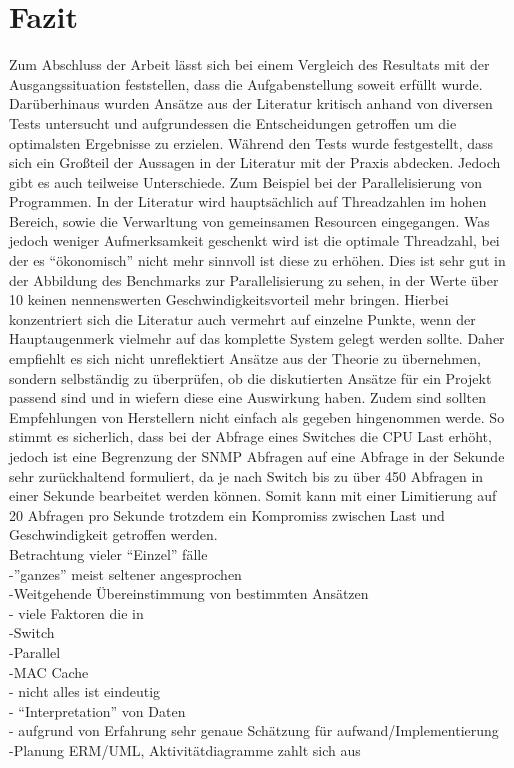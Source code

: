 \chapter{Fazit}
\label{cha:Fazit}

Zum Abschluss der Arbeit lässt sich bei einem Vergleich des Resultats mit der Ausgangssituation feststellen, dass die Aufgabenstellung soweit erfüllt wurde. Darüberhinaus wurden Ansätze aus der Literatur kritisch anhand von diversen Tests untersucht und aufgrundessen die Entscheidungen getroffen um die optimalsten Ergebnisse zu erzielen.
Während den Tests wurde festgestellt, dass sich ein Großteil der Aussagen in der Literatur mit der Praxis abdecken. Jedoch gibt es auch teilweise Unterschiede. Zum Beispiel bei der Parallelisierung von Programmen. In der Literatur wird hauptsächlich auf Threadzahlen im hohen Bereich, sowie die Verwarltung von gemeinsamen Resourcen eingegangen. Was jedoch weniger Aufmerksamkeit geschenkt wird ist die optimale Threadzahl, bei der es “ökonomisch” nicht mehr sinnvoll ist diese zu erhöhen. Dies ist sehr gut in der Abbildung des Benchmarks zur Parallelisierung zu sehen, in der Werte über 10 keinen nennenswerten Geschwindigkeitsvorteil mehr bringen. Hierbei konzentriert sich die Literatur auch vermehrt auf einzelne Punkte, wenn der Hauptaugenmerk vielmehr auf das komplette System gelegt werden sollte. Daher empfiehlt es sich nicht unreflektiert Ansätze aus der Theorie zu übernehmen, sondern selbständig zu überprüfen, ob die diskutierten Ansätze für ein Projekt passend sind und in wiefern diese eine Auswirkung haben.
Zudem sind sollten Empfehlungen von Herstellern nicht einfach als gegeben hingenommen werde. So stimmt es sicherlich, dass bei der Abfrage eines Switches die CPU Last erhöht, jedoch ist eine Begrenzung der SNMP Abfragen auf eine Abfrage in der Sekunde sehr zurückhaltend formuliert, da je nach Switch bis zu über 450 Abfragen in einer Sekunde bearbeitet werden können. Somit kann mit einer Limitierung auf 20 Abfragen pro Sekunde trotzdem ein Kompromiss zwischen Last und Geschwindigkeit getroffen werden.\\

Betrachtung vieler “Einzel” fälle\\
-”ganzes” meist seltener angesprochen\\
-Weitgehende Übereinstimmung von bestimmten Ansätzen\\
- viele Faktoren die in \\
    -Switch\\
    -Parallel\\
    -MAC Cache\\
- nicht alles ist eindeutig\\
- “Interpretation” von Daten\\
- aufgrund von Erfahrung sehr genaue Schätzung für aufwand/Implementierung\\
-Planung ERM/UML, Aktivitätdiagramme zahlt sich aus\\